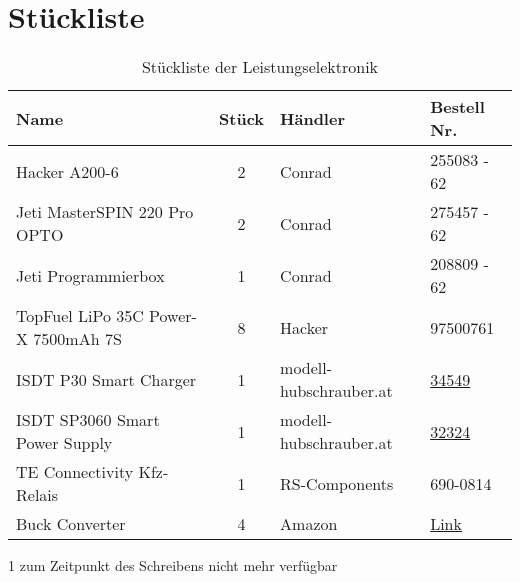 \section{Stückliste}

\begin{table}[h]
    \begin{threeparttable}
    \centering
    \begin{tabular}{|l|c|M{3cm}|l|}
        \hline
    Name                         & Stück & Händler & Bestell Nr. \\\hline
    Hacker A200-6                & 2      & Conrad  & 255083 - 62 \\
    Jeti MasterSPIN 220 Pro OPTO & 2      & Conrad  & 275457 - 62 \\
    Jeti Programmierbox          & 1      & Conrad  & 208809 - 62 \\\hline
    TopFuel LiPo 35C Power-X 7500mAh 7S & 8 & Hacker & 97500761 \\\hline
    ISDT P30 Smart Charger & 1 & modell-hubschrauber.at & \href{https://www.modell-hubschrauber.at/Ladegeraete-Netzteile-Ladekabel-und-Zubehoer/Ladegeraete/Ladegeraete-12Volt/iSDT-SMART-Dup-Ladegeraet-P30-1500W-30A-8S-Lipo::43075.html}{34549}\\
    ISDT SP3060 Smart Power Supply & 1 & modell-hubschrauber.at & \href{https://www.modell-hubschrauber.at/Ladegeraete-Netzteile-Ladekabel-und-Zubehoer/Netzteile/iSDT-SP3060-SMART-POWER-Schaltnetzteil-21-29Volt-60Ampere-1800Watt::40657.html}{32324}\\\hline
    TE Connectivity Kfz-Relais & 1 & RS-Components & 690-0814 \\\hline
    Buck Converter & 4 & Amazon & \href{https://www.amazon.de/gp/product/B085DSMFQM/ref=ppx_yo_dt_b_asin_image_o03_s00?ie=UTF8&psc=1}{Link} \\\hline 
    \end{tabular}
    \begin{tablenotes}\footnotesize 
        \item[1] zum Zeitpunkt des Schreibens nicht mehr verfügbar 
    \end{tablenotes}
\end{threeparttable}
    \caption{Stückliste der Leistungselektronik}
\end{table}

\newpage